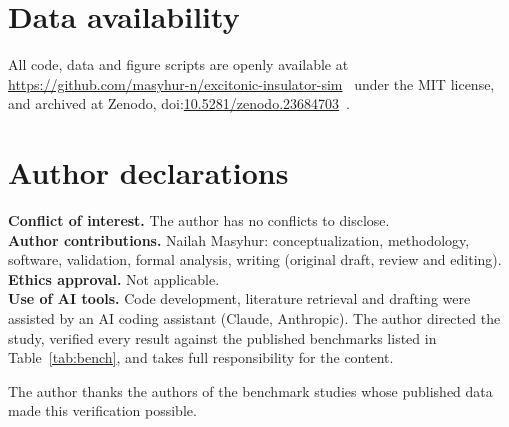 \documentclass[aip,jap,reprint,amsmath,amssymb]{revtex4-2}
\begin{document}
\section*{Data availability}
All code, data and figure scripts are openly available at \url{https://github.com/masyhur-n/excitonic-insulator-sim}~\cite{repo} under the MIT license, and archived at Zenodo, doi:\href{https://doi.org/10.5281/zenodo.23684703}{10.5281/zenodo.23684703}~\cite{repo}.

\section*{Author declarations}
\noindent\textbf{Conflict of interest.} The author has no conflicts to disclose.\\
\textbf{Author contributions.} Nailah Masyhur: conceptualization, methodology, software, validation, formal analysis, writing (original draft, review and editing).\\
\textbf{Ethics approval.} Not applicable.\\
\textbf{Use of AI tools.} Code development, literature retrieval and drafting were assisted by an AI coding
assistant (Claude, Anthropic). The author directed the study, verified every result against the published
benchmarks listed in Table~\ref{tab:bench}, and takes full responsibility for the content.

\begin{acknowledgments}
The author thanks the authors of the benchmark studies whose published data made this verification possible.
\end{acknowledgments}


\end{document}
